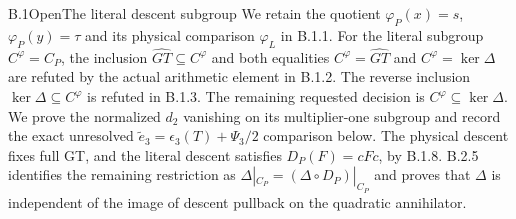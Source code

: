 \begin{result}{B.1}{Open}{The literal descent subgroup}
We retain the quotient $\varphi_P(x)=s$, $\varphi_P(y)=\tau$
and its physical comparison $\varphi_L$ in B.1.1.
For the literal subgroup $C^\varphi=C_P$, the inclusion
$\widehat{GT}\subseteq C^\varphi$ and both equalities
$C^\varphi=\widehat{GT}$ and $C^\varphi=\ker\Delta$
are refuted by the actual arithmetic element in B.1.2.
The reverse inclusion $\ker\Delta\subseteq C^\varphi$
is refuted in B.1.3. The remaining requested decision is
$C^\varphi\subseteq\ker\Delta$. We prove the normalized
$d_2$ vanishing on its multiplier-one subgroup and record
the exact unresolved $\widetilde e_3=\epsilon_3(T)+\Psi_3/2$ comparison below.
The physical descent fixes full GT, and the literal descent
satisfies $D_P(F)=cFc$, by B.1.8. B.2.5 identifies the remaining
restriction as $\Delta|_{C_P}=(\Delta\circ D_P)|_{C_P}$ and
proves that $\Delta$ is independent of the image of descent
pullback on the quadratic annihilator.
\end{result}


